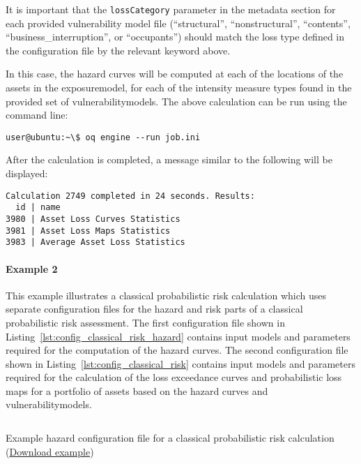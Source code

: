 It is important that the
\Verb+lossCategory+ parameter in the metadata section for each provided
vulnerability model file (``structural'', ``nonstructural'', ``contents'',
``business\_interruption'', or ``occupants'') should match the loss type
defined in the configuration file by the relevant keyword above.

In this case, the hazard curves will be computed at each of the locations of
the \glspl{asset} in the \gls{exposuremodel}, for each of the intensity
measure types found in the provided set of \glspl{vulnerabilitymodel}. The
above calculation can be run using the command line:

\begin{verbatim}
user@ubuntu:~\$ oq engine --run job.ini
\end{verbatim}

After the calculation is completed, a message similar to the following will be
displayed:

\begin{verbatim}
Calculation 2749 completed in 24 seconds. Results:
  id | name
3980 | Asset Loss Curves Statistics
3981 | Asset Loss Maps Statistics
3983 | Average Asset Loss Statistics
\end{verbatim}


\paragraph{Example 2}

This example illustrates a classical probabilistic risk calculation which uses
separate configuration files for the hazard and risk parts of a classical
probabilistic risk assessment. The first configuration file shown in
Listing~\ref{lst:config_classical_risk_hazard} contains input models and
parameters required for the computation of the hazard curves. The second
configuration file shown in Listing~\ref{lst:config_classical_risk} contains
input models and parameters required for the calculation of the loss
exceedance curves and probabilistic loss maps for a portfolio of \glspl{asset}
based on the hazard curves and \glspl{vulnerabilitymodel}.

\begin{listing}[htbp]
  \inputminted[firstline=1,firstnumber=1,fontsize=\footnotesize,frame=single,linenos,bgcolor=lightgray,label=job\_hazard.ini]{ini}{oqum/risk/verbatim/config_classical_hazard.ini}
  \caption{Example hazard configuration file for a classical probabilistic risk calculation (\href{https://raw.githubusercontent.com/gem/oq-engine/master/doc/manual/oqum/risk/verbatim/config_classical_hazard.ini}{Download example})}
  \label{lst:config_classical_risk_hazard}
\end{listing}

